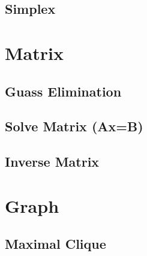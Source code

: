 \documentclass[10pt,twocolumn,oneside]{article}
\begin{document}
    \subsection{Simplex}
    

    \section{Matrix}
    \subsection{Guass Elimination}
    \subsection{Solve Matrix (Ax=B)}
    \subsection{Inverse Matrix}
    


    \section{Graph}
    \subsection{Maximal Clique}
    
\end{document}
